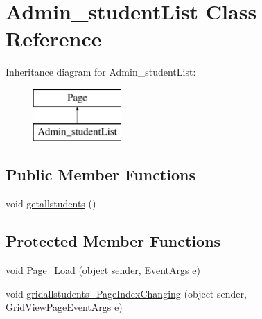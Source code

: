 \hypertarget{class_admin__student_list}{}\section{Admin\+\_\+student\+List Class Reference}
\label{class_admin__student_list}
Inheritance diagram for Admin\+\_\+student\+List\+:\begin{figure}[H]
\begin{center}
\leavevmode
\includegraphics[height=2.000000cm]{class_admin__student_list}
\end{center}
\end{figure}
\subsection*{Public Member Functions}
\begin{DoxyCompactItemize}
\item 
void \mbox{\hyperlink{class_admin__student_list_ab68c19696445a9650085c5e2ac854db5}{getallstudents}} ()
\end{DoxyCompactItemize}
\subsection*{Protected Member Functions}
\begin{DoxyCompactItemize}
\item 
void \mbox{\hyperlink{class_admin__student_list_a95ef857955c3447d57d829118268deb7}{Page\+\_\+\+Load}} (object sender, Event\+Args e)
\item 
void \mbox{\hyperlink{class_admin__student_list_aa88d1ea2c951d587348d51f408e601d2}{gridallstudents\+\_\+\+Page\+Index\+Changing}} (object sender, Grid\+View\+Page\+Event\+Args e)
\end{DoxyCompactItemize}
